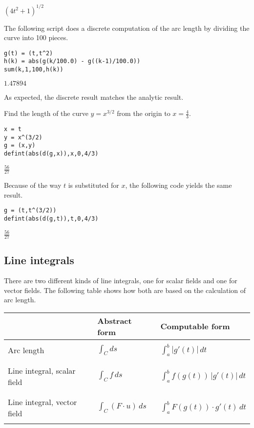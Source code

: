 \noindent
$\displaystyle (4t^2+1)^{1/2}$

\bigskip
\noindent
The following script does a discrete computation of the arc length
by dividing the curve into 100 pieces.

\begin{Verbatim}[formatcom=\color{blue},samepage=true]
g(t) = (t,t^2)
h(k) = abs(g(k/100.0) - g((k-1)/100.0))
sum(k,1,100,h(k))
\end{Verbatim}

\noindent
$\displaystyle 1.47894$

\bigskip
\noindent
As expected, the discrete result matches the analytic result.

\bigskip
\noindent
Find the length of the curve $y=x^{3/2}$ from the origin to
$x=\tfrac{4}{3}$.

\begin{Verbatim}[formatcom=\color{blue},samepage=true]
x = t
y = x^(3/2)
g = (x,y)
defint(abs(d(g,x)),x,0,4/3)
\end{Verbatim}

\noindent
$\displaystyle \tfrac{56}{27}$

\bigskip
\noindent
Because of the way $t$ is substituted for $x$,
the following code yields the same result.

\begin{Verbatim}[formatcom=\color{blue},samepage=true]
g = (t,t^(3/2))
defint(abs(d(g,t)),t,0,4/3)
\end{Verbatim}

\noindent
$\displaystyle \tfrac{56}{27}$

\subsection{Line integrals}
There are two different kinds of line integrals,
one for scalar fields and one
for vector fields.
The following table shows how both are based on the calculation of
arc length.

\begin{center}
\begin{tabular}{|l|l|l|}
\hline
& Abstract form
& Computable form
\\
\hline
 & &\\
Arc length
& $\displaystyle{\int_C ds}$
& $\displaystyle{\int_a^b |g'(t)|\,dt}$\\
 & &\\
\hline
 & & \\
Line integral, scalar field
& $\displaystyle{\int_C f\,ds}$
& $\displaystyle{\int_a^b f(g(t))\,|g'(t)|\,dt}$\\
& &\\
\hline
 & & \\
Line integral, vector field
& $\displaystyle{\int_C(F\cdot u)\,ds}$
& $\displaystyle{\int_a^b F(g(t))\cdot g'(t)\,dt}$\\
 & & \\
\hline
\end{tabular}
\end{center}

